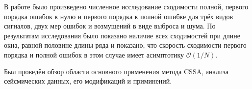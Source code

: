 \documentclass[specialist,
               substylefile = spbu.rtx,
               subf,href,colorlinks=true, 12pt]{disser}
\begin{document}
В работе было произведено численное исследование сходимости полной, первого порядка ошибок к нулю и первого порядка к полной ошибке для трёх видов сигналов, двух мер ошибок и возмущений в виде выброса и шума. По результатам исследования было показано наличие всех сходимостей при длине окна, равной половине длины ряда и показано, что скорость сходимости первого порядка и полной ошибок в этом случае имеет асимптотику $\mathcal{O}(1/N)$. 

Был проведён обзор области основного применения метода CSSA, анализа сейсмических данных, его модификаций и приминений.



\end{document}
